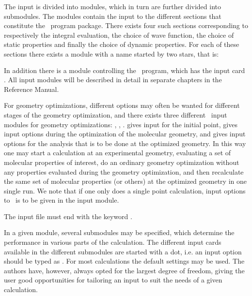 The input is divided into modules, which in turn are
further divided into submodules. The modules contain
the input to the different
sections that constitute the \siraba\ program package. There exists
four such sections corresponding to respectively the integral
evaluation, the choice of wave function, the
choice of static properties and finally
the choice of dynamic properties. For each of
these sections there exists a module with a name started by two stars,
that is:

\begin{list}{}{}
\item {}
\item {}
\item {}
\item {}
\end{list}

In addition there is a module controlling the \siraba\ program, which
has the input card . All
input modules will be described in detail in separate chapters in the
Reference Manual.

For geometry optimizations,
different options may often be wanted for different stages of the
geometry optimization, and there exists three different \aba\ input
modules for geometry optimizations: , ,
.  gives input for the initial point,
 gives input options during the optimization of the
molecular geometry, and  gives input options for the
analysis that is to be done at the optimized geometry. In this way one
may start a calculation at an experimental geometry, evaluating a set
of molecular properties of interest, do an ordinary geometry
optimization without any properties evaluated during the geometry
optimization, and then recalculate the same set of molecular
properties (or others) at the optimized geometry in one single run. We
note that if one only does a single point calculation, input
options to \aba\ is to be given in the  input
module.

The input file must end with the keyword .

In a given module, several submodules may be
specified, which determine the performance in various parts of the
calculation. The different input cards available
in the different submodules are started with a dot, i.e. an input
option should be typed as . For most calculations the
default settings may be used. The authors have, however, always
opted for the largest degree of freedom, giving the user good
opportunities for tailoring an input to suit the needs of a given
calculation.

